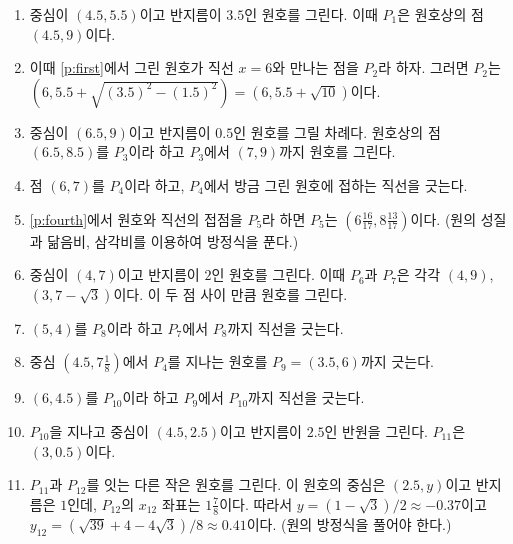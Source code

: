 \begin{figure}
\end{figure}

\begin{enumerate}
\item  중심이 $(4.5, 5.5)$이고 반지름이 $3.5$인 원호를 그린다. 이때
  $P_1$은 원호상의 점 $(4.5, 9)$이다. \label{p:first}


\item 이때 \ref{p:first}에서 그린 원호가 직선 $x=6$와 만나는 점을
  $P_2$라 하자. 그러면 $P_2$는 $(6, 5.5+\sqrt{(3.5)^2 - (1.5)^2})= (6, 5.5+\sqrt{10})$이다.

\item 중심이 $(6.5, 9)$이고 반지름이 $0.5$인 원호를 그릴 차례다. 원호상의
   점 $(6.5, 8.5)$를 $P_3$이라 하고 $P_3$에서 $(7, 9)$까지 원호를 그린다. 

\item 점 $(6, 7)$를 $P_4$이라 하고, $P_4$에서 방금 그린 원호에 접하는
  직선을 긋는다.\label{p:fourth}

\item \ref{p:fourth}에서 원호와 직선의 접점을 $P_5$라 하면  $P_5$는
 $\left (6\frac{16}{17}, 8\frac{13}{17}\right )$이다. (원의 성질과
 닮음비, 삼각비를 이용하여 방정식을 푼다.)


\item 중심이 $(4, 7)$이고 반지름이 $2$인 원호를 그린다. 이때 $P_6$과
  $P_7$은 각각 $(4, 9)$, $(3, 7-\sqrt3)$이다. 이 두 점 사이 만큼
  원호를 그린다.

\item $(5, 4)$를 $P_8$이라 하고 $P_7$에서 $P_8$까지 직선을 긋는다.


\item 중심 $(4.5, 7\frac{1}{8})$에서 $P_4$를 지나는 원호를 $P_9 = (3.5,
  6)$까지 긋는다. 

\item $(6, 4.5)$를 $P_{10}$이라 하고 $P_9$에서 $P_{10}$까지 직선을
  긋는다.

\item $P_{10}$을 지나고 중심이 $(4.5, 2.5)$이고 반지름이 $2.5$인
  반원을 그린다. $P_{11}$은 $(3, 0.5)$이다.

\item $P_{11}$과 $P_{12}$를 잇는  다른 작은 원호를
 그린다. 이 원호의 중심은 $(2.5, y)$이고 반지름은
  $1$인데, $P_{12}$의 $x_{12}$ 좌표는 $1\frac78$이다. 따라서
 $y=(1-\sqrt3)/2 \approx -0.37$이고 $y_{12}=(\sqrt{39}+4-4\sqrt{3}) / 8
 \approx 0.41$이다. (원의 방정식을 풀어야 한다.) 


\end{enumerate}
